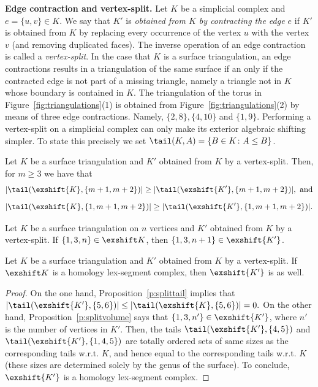 %
\noindent
{\bf Edge contraction and vertex-split.}
Let $K$ be a simplicial complex and $e=\{u,v\}\in K$. We say that $K'$ is \emph{obtained from $K$ by contracting the edge $e$} if $K'$ is obtained from $K$ by replacing every occurrence of the vertex $u$ with the vertex $v$ (and removing duplicated faces).
The inverse operation of an edge contraction is called a \emph{vertex-split}.
In the case that $K$ is a surface triangulation, an edge contractions results in a triangulation of the same surface if an only if the contracted edge is not part of a missing triangle, namely a triangle not in $K$ whose boundary is contained in $K$. The triangulation of the torus in Figure~\ref{fig:triangulations}(1) is obtained from Figure~\ref{fig:triangulations}(2) by means of three edge contractions. Namely, $\{2,8\},\{4,10\}$ and $\{1,9\}$.
Performing a vertex-split on a simplicial complex can only make its exterior algebraic shifting simpler.
To state this precisely we set $\tail(K,A) = \{B \in K \colon A \leq B\}$.
%
\begin{proposition}
  \label{p:splittail}
  Let $K$ be a surface triangulation and $K'$ obtained from $K$ by a vertex-split.
  Then, for $m\geq 3$ we have that
  $$|\tail(\exshift{K},\{m+1,m+2\})| \geq |\tail(\exshift{K'}, \{m+1,m+2\})|,~\text{and}$$
  $$|\tail(\exshift{K},\{1,m+1,m+2\})| \geq |\tail(\exshift{K'}, \{1,m+1,m+2\})|.$$
\end{proposition}
%
\begin{proposition}
  \label{p:splitvolume}
  Let $K$ be a surface triangulation on $n$ vertices and $K'$ obtained from $K$ by a vertex-split.
  If $\{1,3,n\}\in \exshift K$, then $\{1,3,n+1\}\in \exshift{K'}$.
\end{proposition}
%
\begin{corollary}
\label{c:splithlex}
  Let $K$ be a surface triangulation and $K'$ obtained from $K$ by a vertex-split.
  If $\exshift K$ is a homology lex-segment complex, then $\exshift{K'}$ is as well.
\end{corollary}
\begin{proof}
  On the one hand, Proposition~\ref{p:splittail} implies that $|\tail(\exshift{K'},\{5,6\})|\leq |\tail(\exshift{K},\{5,6\})|=0.$
  On the other hand, Proposition~\ref{p:splitvolume} says that $\{1,3,n'\}\in \exshift{K'}$, where $n'$ is the number of vertices in $K'$.
  Then, the tails $\tail(\exshift{K'},\{4,5\})$ and $\tail(\exshift{K'},\{1,4,5\})$ are totally ordered sets 
  of same sizes as the corresponding tails w.r.t. $K$, and hence equal to the corresponding tails w.r.t. $K$
  (these sizes are determined solely by the genus of the surface). To conclude, $\exshift{K'}$ is a homology lex-segment complex.
\end{proof}
